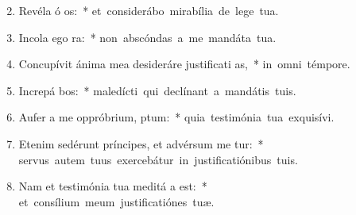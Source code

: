 \begin{flushleft}
\begin{enumerate}[leftmargin=*]
\setcounter{enumi}{1}

\item Revéla ó os:~* \mbox{et considerábo mirabília de lege tua.}
\item Incola ego   ra:~* \mbox{non abscóndas a me mandáta tua.}
\item Concupívit ánima mea desideráre justificati as,~* \mbox{in omni témpore.}
\item Increpá bos:~* \mbox{maledícti qui declínant a mandátis tuis.}
\item Aufer a me oppróbrium,  ptum:~* \mbox{quia testimónia tua exquisívi.}
\item Etenim sedérunt príncipes, et advérsum me tur:~* \mbox{servus autem tuus exercebátur in justificatiónibus tuis.}
\item Nam et testimónia tua meditá a est:~* \mbox{et consílium meum justificatiónes tuæ.}

\end{enumerate}
\end{flushleft}

